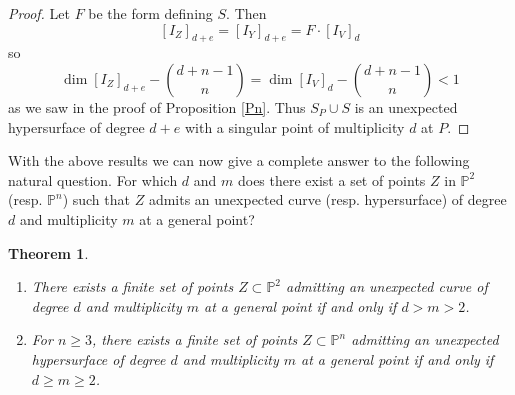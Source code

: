 \documentclass[12pt]{amsart}
\numberwithin{equation}{section}
\newtheorem{theorem}{Theorem}[section]
\theoremstyle{definition}
\newcommand{\PP}{ \ensuremath{\mathbb{P}}}
\begin{document}
\begin{proof}
Let $F$ be the form defining $S$. Then
\[
 [I_Z]_{d+e} =  [I_Y]_{d+e} = F \cdot [I_V]_d
\]
so
\[
\dim [I_Z]_{d+e} - \binom{d+n-1}{n} = \dim [I_V]_d - \binom{d+n-1}{n} < 1
\]
as we saw in the proof of Proposition \ref{Pn}. Thus $S_P \cup S$ is an unexpected hypersurface of degree $d+e$ with a singular point of multiplicity $d$ at $P$.
\end{proof}

With the above results we can now give a complete answer to the following natural question. For which $d$ and $m$ does there exist a 
set of points $Z$ in $\PP^2$ (resp. $\PP^n$) such that $Z$ admits an unexpected curve (resp. hypersurface) of degree $d$ and multiplicity $m$ at a general point?

\begin{theorem} \label{m<d}\ 

\begin{enumerate}[label={(\roman*)}]
\item There exists a finite set of points $Z \subset \PP^2$ admitting an unexpected curve of degree $d$ and multiplicity $m$ at a general point if and only if $d > m > 2$.

\item For $n \geq 3$, there exists a finite set of points $Z \subset \PP^n$ admitting an unexpected hypersurface of degree $d$ and multiplicity $m$ at a general point if and only if $d \geq m \geq 2$.

\end{enumerate}
\end{theorem}
\end{document}
